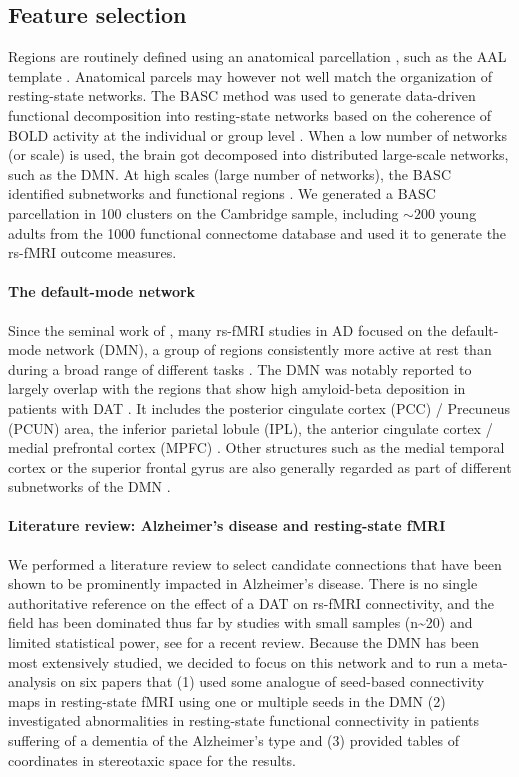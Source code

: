 \subsection{Feature selection}
Regions are routinely defined using an anatomical parcellation \citep{He2009}, such as the AAL template \citep{Tzourio-Mazoyer2002}. Anatomical parcels may however not well match the organization of resting-state networks. The BASC method was used to generate data-driven functional decomposition into resting-state networks based on the coherence of BOLD activity at the individual or group level \citep{Bellec2006,Bellec2010c,Bellec2013}. When a low number of networks (or scale) is used, the brain got decomposed into distributed large-scale networks, such as the DMN. At high scales (large number of networks), the BASC identified subnetworks and functional regions \citep{Kelly2012}. We generated a BASC parcellation in 100 clusters on the Cambridge sample, including $\sim 200$ young adults from the 1000 functional connectome database \citep{Biswal2010} and used it to generate the rs-fMRI outcome measures.

\paragraph{The default-mode network}
Since the seminal work of \cite{Greicius2004}, many rs-fMRI studies in AD focused on the default-mode network (DMN), a group of regions consistently more active at rest than during a broad range of different tasks \citep{Gusnard2001}. The DMN was notably reported to largely overlap with the regions that show high amyloid-beta deposition in patients with DAT \citep{Buckner2009}. It includes the posterior cingulate cortex (PCC) / Precuneus (PCUN) area, the inferior parietal lobule (IPL), the anterior cingulate cortex / medial prefrontal cortex (MPFC) \citep{Greicius2003}. Other structures such as the medial temporal cortex or the superior frontal gyrus are also generally regarded as part of different subnetworks of the DMN \citep{Margulies2009, Andrews-Hanna2010a}.

\paragraph{Literature review: Alzheimer's disease and resting-state fMRI}
We performed a literature review to select candidate connections that have been shown to be prominently impacted in Alzheimer's disease. There is no single authoritative reference on the effect of a DAT on rs-fMRI connectivity, and the field has been dominated thus far by studies with small samples (n\textasciitilde20) and limited statistical power, see \cite{Sheline2013} for a recent review. Because the DMN has been most extensively studied, we decided to focus on this network and to run a meta-analysis on six papers that (1) used some analogue of seed-based connectivity maps in resting-state fMRI using one or multiple seeds in the DMN (2) investigated abnormalities in resting-state functional connectivity in patients suffering of a dementia of the Alzheimer's type and (3) provided tables of coordinates in stereotaxic space for the results.

